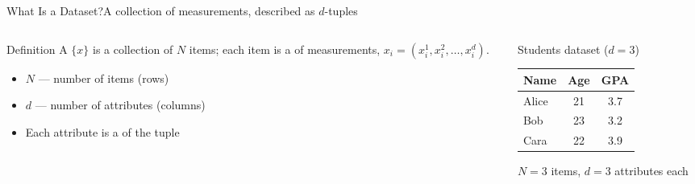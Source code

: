 \documentclass[aspectratio=169,11pt]{beamer}
\begin{document}
\begin{frame}{What Is a Dataset?}{A collection of measurements, described as $d$-tuples}
  \begin{columns}[T]
    \begin{column}{0.52\textwidth}
      \begin{block}{Definition}
        \small A  $\{x\}$ is a collection of $N$ items;
        each item is a  of measurements,
        $x_i = (x_i^1, x_i^2, \dots, x_i^d)$.
      \end{block}
      \begin{itemize}\small
        \item $N$ — number of items (rows)
        \item $d$ — number of attributes (columns)
        \item Each attribute is a  of the tuple
      \end{itemize}
    \end{column}
    \begin{column}{0.48\textwidth}
      \begin{exampleblock}{Students dataset ($d=3$)}
        \small
        \renewcommand{\arraystretch}{1.2}
        \begin{tabular}{@{}lcc@{}}
          \toprule
          \textbf{Name} & \textbf{Age} & \textbf{GPA} \\
          \midrule
          Alice & 21 & 3.7 \\
          Bob   & 23 & 3.2 \\
          Cara  & 22 & 3.9 \\
          \bottomrule
        \end{tabular}
      \end{exampleblock}
      \centering\scriptsize $N = 3$ items, $d = 3$ attributes each
    \end{column}
  \end{columns}
\end{frame}
\end{document}
